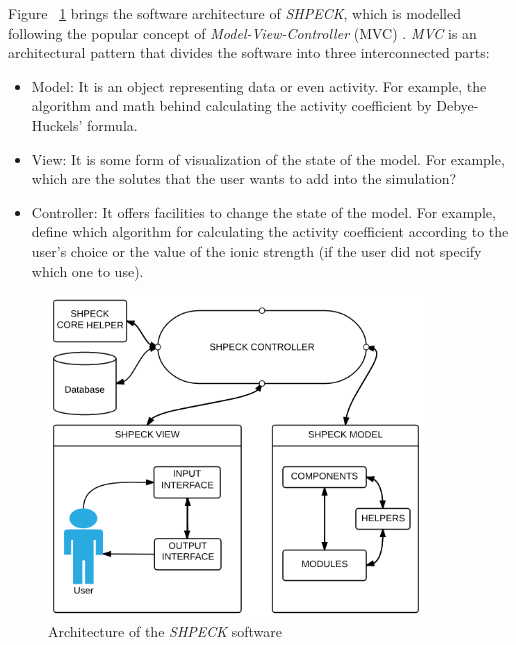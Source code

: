 \documentclass[ppgc,mestrado,english]{iiufrgs}
\begin{document}
Figure ~\ref{fig:shpeck-architecture} brings the software architecture of \emph{SHPECK}, which is modelled following the popular concept of \emph{Model-View-Controller} (MVC) \cite{Gamma:94}. \emph{MVC} is an architectural pattern that divides the software into three interconnected parts:
\begin{itemize}
\item Model: It is an object representing data or even activity. For example, the algorithm and math behind calculating the activity coefficient by Debye-Huckels' formula.
\item View: It is some form of visualization of the state of the model. For example, which are the solutes that the user wants to add into the simulation?
\item Controller: It offers facilities to change the state of the model. For example, define which algorithm for calculating the activity coefficient according to the user's choice or the value of the ionic strength (if the user did not specify which one to use).
\end{itemize}

\begin{figure}[ht!]
\centering
\includegraphics[width=100mm]{shpeck-architecture.png}
\caption{Architecture of the \emph{SHPECK} software}
\label{fig:shpeck-architecture}
\end{figure}
\end{document}
